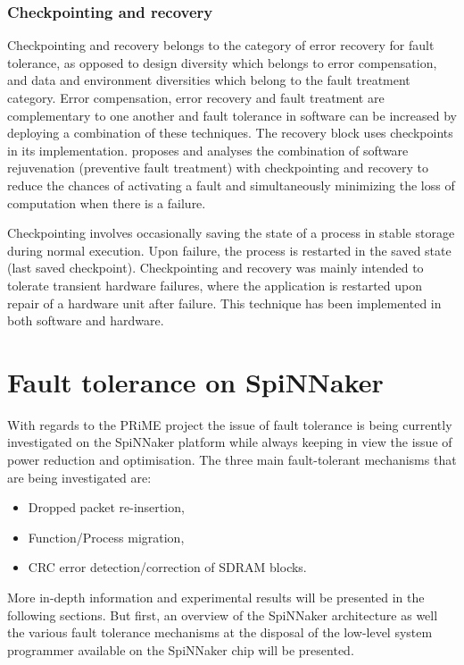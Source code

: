 \documentclass[a4paper, 11pt]{article}
\begin{document}
\subsubsection{Checkpointing and recovery}
Checkpointing and recovery \citep{kulkarni1990effects} belongs to the category of error recovery for fault tolerance, as opposed to design diversity which belongs to error compensation, and data and environment diversities which belong to the fault treatment category. Error compensation, error recovery and fault treatment are complementary to one another and fault tolerance in software can be increased by deploying a combination of these techniques. The recovery block uses checkpoints in its implementation. \citet{garg1996minimizing} proposes and analyses the combination of software rejuvenation (preventive fault treatment) with checkpointing and recovery to reduce the chances of activating a fault and simultaneously minimizing the loss of computation when there is a failure.

Checkpointing involves occasionally saving the state of a process in stable storage during normal execution. Upon failure, the process is restarted in the saved state (last saved checkpoint). Checkpointing and recovery was mainly intended to tolerate transient hardware failures, where the application is restarted upon repair of a hardware unit after failure. This technique has been implemented in both software and hardware.

\newpage
\section{Fault tolerance on SpiNNaker}
\label{sec:ft_spinnaker}

With regards to the PRiME project the issue of fault tolerance is being currently investigated on the SpiNNaker platform while always keeping in view the issue of power reduction and optimisation. The three main fault-tolerant mechanisms that are being investigated are:
\begin{itemize}
\item Dropped packet re-insertion,
\item Function/Process migration,
\item CRC error detection/correction of SDRAM blocks.
\end{itemize}
More in-depth information and experimental results will be presented in the following sections. But first, an overview of the SpiNNaker architecture as well the various fault tolerance mechanisms at the disposal of the low-level system programmer available on the SpiNNaker chip will be presented.
\end{document}
